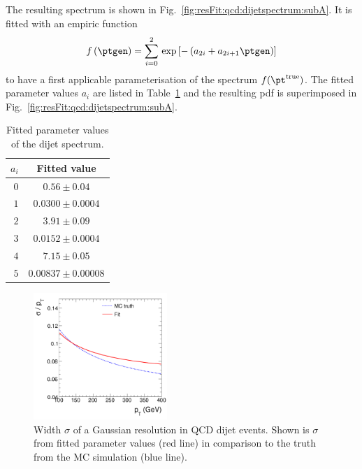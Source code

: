 \documentclass[a4paper]{cmspaper} %
\newcommand{\truth}{\ensuremath{\pt^{\text{true}}}\xspace}
\begin{document}
The resulting \ptgen spectrum is shown in Fig.~\ref{fig:resFit:qcd:dijetspectrum:subA}.
It is fitted with an empiric function
\begin{equation}
  \label{eq:resFit:qcd:ptGenSpectrum}
  f\left(\ptgen\right) = \sum^{2}_{i=0}\,\exp\left[-\left(a_{2i} + a_{2i+1}\ptgen\right)\right]
\end{equation}
to have a first applicable parameterisation of the spectrum
$f(\truth)$.
The fitted parameter values $a_{i}$ are listed in
Table~\ref{tab:resFit:qcd:dijetspectrum} and the resulting pdf is
superimposed in Fig.~\ref{fig:resFit:qcd:dijetspectrum:subA}.
\begin{table}[ht]
  \centering
  \begin{tabular}{rc}
    \hline
    \hline
    $a_{i}$ & Fitted value \\
    \hline
    $0$ & $0.56 \pm 0.04$ \\
    $1$ & $0.0300 \pm 0.0004$ \\
    $2$ & $3.91 \pm 0.09$ \\
    $3$ & $0.0152 \pm 0.0004$ \\
    $4$ & $7.15 \pm 0.05$ \\
    $5$ & $0.00837 \pm 0.00008$ \\
    \hline
    \hline
  \end{tabular}
 \caption{Fitted parameter values of the dijet \ptgen spectrum.}
  \label{tab:resFit:qcd:dijetspectrum}
\end{table}

\begin{figure}[ht]
  \centering
  \includegraphics[width=0.45\textwidth]{figures/resFit_PtDependentSigma}
  \caption{Width $\sigma$ of a Gaussian resolution in QCD dijet events. Shown is $\sigma$ from fitted parameter values (red line) in comparison to the truth from the MC simulation (blue line).}
  \label{fig:resFit:qcd:ptDependentSigma}
\end{figure}
\end{document}
